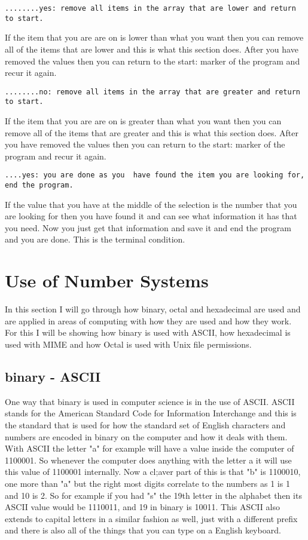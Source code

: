 \documentclass{article}
\begin{document}
\begin{verbatim}
........yes: remove all items in the array that are lower and return to start.
\end{verbatim}
If the item that you are are on is lower than what you want then you can remove all of the items that are lower and this is what this section does. After you have removed the values then you can return to the start: marker of the program and recur it again. 

\begin{verbatim}
........no: remove all items in the array that are greater and return to start.
\end{verbatim}
If the item that you are are on is greater than what you want then you can remove all of the items that are greater and this is what this section does. After you have removed the values then you can return to the start: marker of the program and recur it again. 

\begin{verbatim}
....yes: you are done as you  have found the item you are looking for, end the program. 
\end{verbatim}
If the value that you have at the middle of the selection is the number that you are looking for then you have found it and can see what information it has that you need. Now you just get that information and save it and end the program and you are done. This is the terminal condition. 

\section{Use of Number Systems}
In this section I will go through how binary, octal and hexadecimal are used and are applied in areas of computing with how they are used and how they work. For this I will be showing how binary is used with ASCII, how hexadecimal is used with MIME and how Octal is used with Unix file permissions. 
\subsection{binary - ASCII}
One way that binary is used in computer science is in the use of ASCII. ASCII stands for the American Standard Code for Information Interchange and this is the standard that is used for how the standard set of English characters and numbers are encoded in binary on the computer and how it deals with them. With ASCII the letter "a" for example will have a value inside the computer of 1100001. So whenever the computer does anything with the letter a it will use this value of 1100001 internally. Now a cl;aver part of this is that "b" is 1100010, one more than "a" but the right most digits correlate to the numbers as 1 is 1 and 10 is 2. So for example if you had "s" the 19th letter in the alphabet then its ASCII value would be 1110011, and 19 in binary is 10011. This ASCII also extends to capital letters in a similar fashion as well, just with a different prefix and there is also all of the things that you can type on a English keyboard.  
\end{document}
